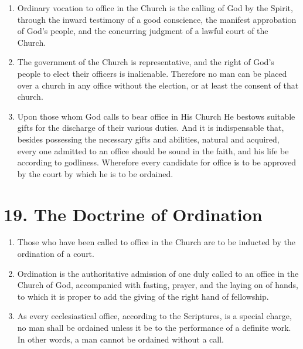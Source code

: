 \documentclass[
]{book}
\providecommand{\tightlist}{%
  \setlength{\itemsep}{0pt}\setlength{\parskip}{0pt}}
\begin{document}
\protect\hypertarget{chapter-slug-18-church-orders-the-doctrine-of-vocation}{\href{}{}}

\begin{enumerate}
\def\labelenumi{\arabic{enumi}.}
\tightlist
\item
  \protect\hypertarget{18}{\href{}{}}Ordinary vocation to office in the Church is the calling of God by the Spirit, through the inward testimony of a good conscience, the manifest approbation of God's people, and the concurring judgment of a lawful court of the Church.
\item
  The government of the Church is representative, and the right of God's people to elect their officers is inalienable. Therefore no man can be placed over a church in any office without the election, or at least the consent of that church.
\item
  Upon those whom God calls to bear office in His Church He bestows suitable gifts for the discharge of their various duties. And it is indispensable that, besides possessing the necessary gifts and abilities, natural and acquired, every one admitted to an office should be sound in the faith, and his life be according to godliness. Wherefore every candidate for office is to be approved by the court by which he is to be ordained.
\end{enumerate}

\hypertarget{the-doctrine-of-ordination}{%
\section*{19. The Doctrine of Ordination}\label{the-doctrine-of-ordination}}

\protect\hypertarget{chapter-slug-19-the-doctrine-of-ordination}{\href{}{}}

\begin{enumerate}
\def\labelenumi{\arabic{enumi}.}
\tightlist
\item
  \protect\hypertarget{19}{\href{}{}}Those who have been called to office in the Church are to be inducted by the ordination of a court.
\item
  Ordination is the authoritative admission of one duly called to an office in the Church of God, accompanied with fasting, prayer, and the laying on of hands, to which it is proper to add the giving of the right hand of fellowship.
\item
  As every ecclesiastical office, according to the Scriptures, is a special charge, no man shall be ordained unless it be to the performance of a definite work. In other words, a man cannot be ordained without a call.
\end{enumerate}
\end{document}

